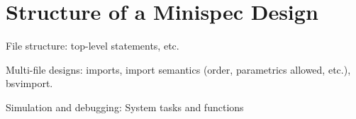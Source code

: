 \section{Structure of a Minispec Design}
\label{sec:design}

File structure: top-level statements, etc.

Multi-file designs: imports, import semantics (order, parametrics allowed, etc.), bsvimport.

Simulation and debugging: System tasks and functions
\label{sec:systemFunctions}
